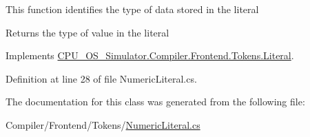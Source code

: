 This function identifies the type of data stored in the literal 

\begin{DoxyReturn}{Returns}
the type of value in the literal
\end{DoxyReturn}


Implements \hyperlink{class_c_p_u___o_s___simulator_1_1_compiler_1_1_frontend_1_1_tokens_1_1_literal_a34d05c00ded660daf66f91bd2543d186}{C\+P\+U\+\_\+\+O\+S\+\_\+\+Simulator.\+Compiler.\+Frontend.\+Tokens.\+Literal}.



Definition at line 28 of file Numeric\+Literal.\+cs.



The documentation for this class was generated from the following file\+:\begin{DoxyCompactItemize}
\item 
Compiler/\+Frontend/\+Tokens/\hyperlink{_numeric_literal_8cs}{Numeric\+Literal.\+cs}\end{DoxyCompactItemize}

